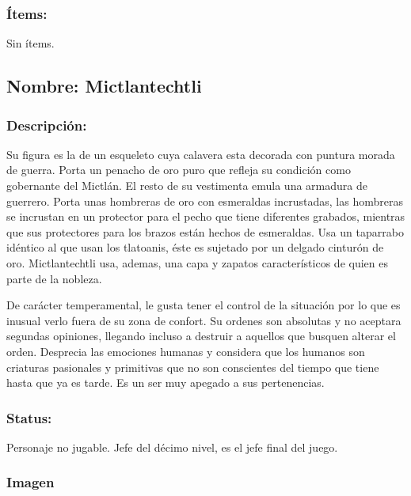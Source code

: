 \documentclass[11pt,letterpaper]{article}
\begin{document}
\subsubsection{Ítems:}
Sin ítems.

\subsection{Nombre: Mictlantechtli}  
\subsubsection{Descripción:}   
Su figura es la de un esqueleto cuya calavera esta decorada con puntura morada de guerra. Porta un penacho de oro puro que refleja su condición como gobernante del Mictlán. El resto de su vestimenta emula una armadura de guerrero. Porta unas hombreras de oro con esmeraldas incrustadas, las hombreras se incrustan en un protector para el pecho que tiene diferentes grabados, mientras que sus protectores para los brazos están hechos de esmeraldas. Usa un taparrabo idéntico al que usan los tlatoanis, éste es sujetado por un delgado cinturón de oro. Mictlantechtli usa, ademas, una capa y zapatos característicos de quien es parte de la nobleza.
\\
\par
De carácter temperamental, le gusta tener el control de la situación por lo que es inusual verlo fuera de su zona de confort. Su ordenes son absolutas y no aceptara segundas opiniones, llegando incluso a destruir a aquellos que busquen alterar el orden. Desprecia las emociones humanas y considera que los humanos son criaturas pasionales y primitivas que no son conscientes del tiempo que tiene hasta que ya es tarde. Es un ser muy apegado a sus pertenencias. 
\subsubsection{Status:}
Personaje no jugable.
Jefe del décimo nivel, es el jefe final del juego.
\subsubsection{Imagen}
\end{document}
